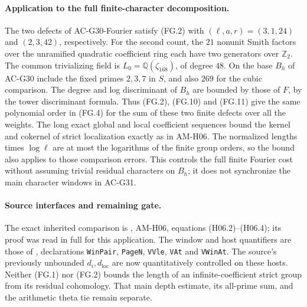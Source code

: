 \paragraph{Application to the full finite-character decomposition.}
The two defects of AC-G30-Fourier satisfy (FG.2) with
$(\ell,a,r)=(3,1,24)$ and $(2,3,42)$, respectively.
For the second count, the $21$ nonunit Smith factors
over the unramified quadratic coefficient ring each
have two generators over $\mathbb Z_2$.
The common trivializing field is
$L_0=\mathbb Q(\zeta_{168})$, of degree $48$.
On the base $B_h$ of AC-G30 include the fixed primes
$2,3,7$ in $S$, and also $269$ for the cubic comparison.
The degree and log discriminant of $B_h$ are bounded
by those of $F$, by the tower discriminant formula.
Thus (FG.2), (FG.10) and (FG.11) give the same
polynomial order in (FG.4) for the sum of these two
finite defects over all the weights.  The long exact
global and local coefficient sequences bound the
kernel and cokernel of strict localization exactly as
in AM-H06.  The normalized lengths times $\log\ell$
are at most the logarithms of the finite group orders,
so the bound also applies to those comparison errors.
This controls the full finite Fourier cost without
assuming trivial residual characters on $B_h$; it
does not synchronize the main character windows in
AC-G31.

\paragraph{Source interfaces and remaining gate.}
The exact inherited comparison is
,
AM-H06, equations (H06.2)--(H06.4); its proof was read
in full for this application.  The window and host
quantifiers are those of
,
declarations \texttt{WinPair}, \texttt{PageN},
\texttt{VVle}, \texttt{VAt} and \texttt{VWinAt}.
The source's previously unbounded $d_i,d_{\mathrm{loc}}$
are now quantitatively controlled on these hosts.
Neither (FG.1) nor (FG.2) bounds the length of an
infinite-coefficient strict group from its residual
cohomology.  That main depth estimate, its all-prime
sum, and the arithmetic theta tie remain separate.

